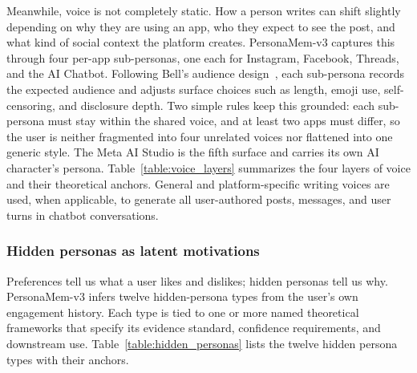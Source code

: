 \documentclass[]{fairmeta}
\begin{document}
Meanwhile, voice is not completely static. How a person writes can shift slightly depending on why they are using an app, who they expect to see the post, and what kind of social context the platform creates.
PersonaMem-v3 captures this through four per-app sub-personas, one each for Instagram, Facebook, Threads, and the AI Chatbot. Following Bell's audience design~\citep{bell1984language}, each sub-persona records the expected audience and adjusts surface choices such as length, emoji use, self-censoring, and disclosure depth. Two simple rules keep this grounded: each sub-persona must stay within the shared voice, and at least two apps must differ, so the user is neither fragmented into four unrelated voices nor flattened into one generic style. The Meta AI Studio is the fifth surface and carries its own AI character's persona. Table~\ref{table:voice_layers} summarizes the four layers of voice and their theoretical anchors. General and platform-specific writing voices are used, when applicable, to generate all user-authored posts, messages, and user turns in chatbot conversations.

\subsubsection{Hidden personas as latent motivations}
\label{subsubsec:hidden_personas}

Preferences tell us what a user likes and dislikes; hidden personas tell us why. PersonaMem-v3 infers twelve hidden-persona types from the user’s own engagement history. Each type is tied to one or more named theoretical frameworks that specify its evidence standard, confidence requirements, and downstream use. Table~\ref{table:hidden_personas} lists the twelve hidden persona types with their anchors.
\end{document}
